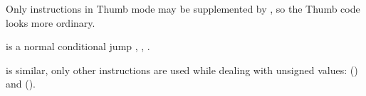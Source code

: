 
Only  instructions in Thumb mode may be supplemented by , so the Thumb code 
looks more ordinary.

 is a normal conditional jump , 
\EMDASH{}, 
\EMDASH{}.

 is similar, only other instructions are used while dealing 
with unsigned values:  
() and  ().

